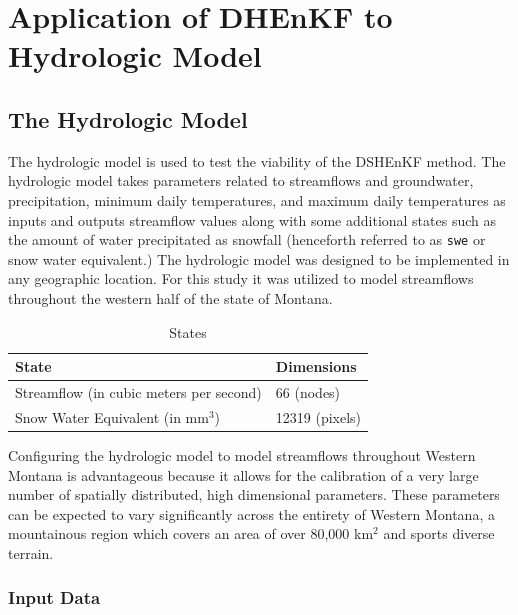 \chapter{Application of DHEnKF to Hydrologic Model}

\section{The Hydrologic Model}

The hydrologic model is used to test the viability of the DSHEnKF method. The hydrologic model takes parameters related to streamflows and groundwater, precipitation, minimum daily temperatures, and maximum daily temperatures as inputs and outputs streamflow values along with some additional states such as the amount of water precipitated as snowfall (henceforth referred to as \texttt{swe} or snow water equivalent.) The hydrologic model was designed to be implemented in any geographic location. For this study it was utilized to model streamflows throughout the western half of the state of Montana.

\begin{table}[]
\caption{States} 
\begin{tabular}{ll}
State                              & Dimensions  \\ \hline
Streamflow (in cubic meters per second)               & 66 (nodes) \\
Snow Water Equivalent  (in mm$^{3}$) & 12319 (pixels)
\end{tabular}
\label{tab:states}
\end{table}

Configuring the hydrologic model to model streamflows throughout Western Montana is advantageous because it allows for the calibration of a very large number of spatially distributed, high dimensional parameters. These parameters can be expected to vary significantly across the entirety of Western Montana, a mountainous region which covers an area of over 80,000 km$^{2}$ and sports diverse terrain.

\subsection{Input Data}

